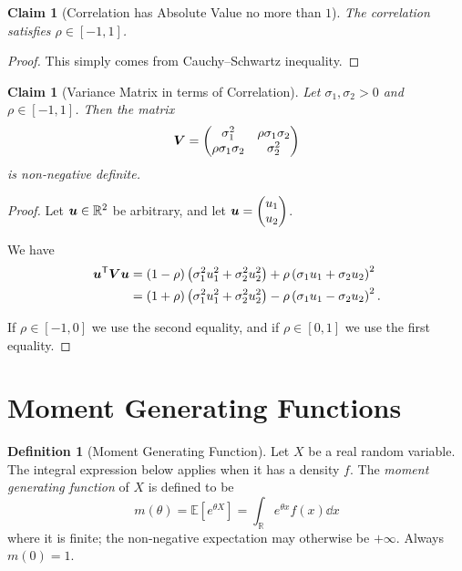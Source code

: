 \documentclass[11pt]{article}
\numberwithin{equation}{section}
\newtheorem{claim}[theorem]{Claim}
\theoremstyle{definition}
\newtheorem{definition}[theorem]{Definition}
\theoremstyle{remark}
\newcommand{\pqty}[1]{\left(#1\right)}
\newcommand{\bqty}[1]{\left[#1\right]}
\newcommand{\ccintv}[2]{[#1,#2]}
\newcommand{\RR}{\mathbb R}
\newcommand{\transpose}{^{\mathsf T}}
\newcommand{\Expt}{\mathbb E}
\newcommand{\pmqty}[1]{\begin{pmatrix}#1\end{pmatrix}}
\begin{document}
\begin{claim}[Correlation has Absolute Value no more than \(1\)]\label{probability-claim-003}
    \label{probability-claim:corr-abs-val-no-more-one}%
    The correlation satisfies \(\rho \in \ccintv{-1}{1}\).
\end{claim}

\begin{proof}\label{probability-proof-075}
    This simply comes from Cauchy--Schwartz inequality.
\end{proof}

\begin{claim}[Variance Matrix in terms of Correlation]\label{probability-claim-004}
    \label{probability-claim:var-mat-corr}%
    Let \(\sigma_1, \sigma_2 > 0\) and \(\rho \in \ccintv{-1}{1}\). Then the matrix
    \[
        \vb{V} = \pmqty{
            \sigma_1^2 & \rho \sigma_1 \sigma_2 \\
            \rho \sigma_1 \sigma_2 & \sigma_2^2
        }
    \]
    is non-negative definite.
\end{claim}

\begin{proof}\label{probability-proof-076}
    Let \(\vb{u} \in \RR^2\) be arbitrary, and let \(\vb{u} = \pmqty{u_1 \\ u_2}\).

    We have
    \begin{align*}
        \vb{u}\transpose \vb{V} \vb{u} &= \pqty{1 - \rho} \pqty{\sigma_1^2 u_1^2 + \sigma_2^2 u_2^2} + \rho \pqty{\sigma_1 u_1 + \sigma_2 u_2}^2 \\
        &= \pqty{1 + \rho} \pqty{\sigma_1^2 u_1^2 + \sigma_2^2 u_2^2} - \rho \pqty{\sigma_1 u_1 - \sigma_2 u_2}^2.
    \end{align*}

    If \(\rho \in \ccintv{-1}{0}\) we use the second equality, and if \(\rho \in \ccintv{0}{1}\) we use the first equality.
\end{proof}

\section{Moment Generating Functions}\label{probability-section-13}

\begin{definition}[Moment Generating Function]\label{probability-definition-062}
    \label{probability-def:moment-generating-fn}%
    Let \(X\) be a real random variable. The integral expression below applies when it has a density \(f\). The \emph{moment generating function} of \(X\) is defined to be
    \[
        m\pqty{\theta} = \Expt\bqty{e^{\theta X}} = \int_{\RR} e^{\theta x} f\pqty{x} \dd{x}
    \]
    where it is finite; the non-negative expectation may otherwise be \(+\infty\). Always \(m\pqty{0} = 1\).
\end{definition}
\end{document}
